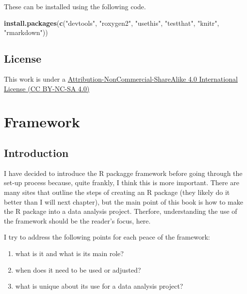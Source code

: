 \documentclass[]{book}
\newenvironment{Shaded}{\begin{snugshade}}{\end{snugshade}}
\newcommand{\KeywordTok}[1]{\textcolor[rgb]{0.13,0.29,0.53}{\textbf{#1}}}
\newcommand{\NormalTok}[1]{#1}
\newcommand{\StringTok}[1]{\textcolor[rgb]{0.31,0.60,0.02}{#1}}
\providecommand{\tightlist}{%
  \setlength{\itemsep}{0pt}\setlength{\parskip}{0pt}}
\begin{document}
These can be installed using the following code.

\begin{Shaded}
\begin{Highlighting}[]
\KeywordTok{install.packages}\NormalTok{(}\KeywordTok{c}\NormalTok{(}\StringTok{"devtools"}\NormalTok{, }\StringTok{"roxygen2"}\NormalTok{, }\StringTok{"usethis"}\NormalTok{, }\StringTok{"testthat"}\NormalTok{,}
                   \StringTok{"knitr"}\NormalTok{, }\StringTok{"rmarkdown"}\NormalTok{))}
\end{Highlighting}
\end{Shaded}

\hypertarget{license}{%
\section*{License}\label{license}}

This work is under a \href{http://creativecommons.org/licenses/by-nc-sa/4.0/}{Attribution-NonCommercial-ShareAlike 4.0 International License (CC BY-NC-SA 4.0)}

\hypertarget{framework}{%
\chapter{Framework}\label{framework}}

\hypertarget{introduction}{%
\section{Introduction}\label{introduction}}

I have decided to introduce the R packagge framework before going through the set-up process because, quite frankly, I think this is more important. There are many sites that outline the steps of creating an R package (they likely do it better than I will next chapter), but the main point of this book is how to make the R package into a data analysis project. Therfore, understanding the use of the framework should be the reader's focus, here.

I try to address the following points for each peace of the framework:

\begin{enumerate}
\def\labelenumi{\arabic{enumi}.}
\tightlist
\item
  what is it and what is its main role?
\item
  when does it need to be used or adjusted?
\item
  what is unique about its use for a data analysis project?
\end{enumerate}
\end{document}

